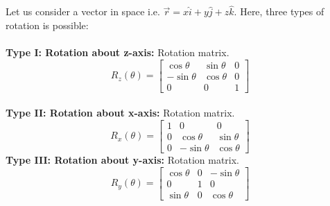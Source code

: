 Let us consider a vector in space i.e. $\vec{r}=x \hat{i}+y \hat{j}+z \hat{k} .$ Here, three types of rotation is possible:
\\\\\textbf{Type I: Rotation about z-axis:}
Rotation matrix. $$R_{z}(\theta)=\left[\begin{array}{ccc}\cos \theta & \sin \theta & 0 \\ -\sin \theta & \cos \theta & 0 \\ 0 & 0 & 1\end{array}\right]$$
\\\textbf{Type  II: Rotation about x-axis:}
Rotation matrix. $$R_{x}(\theta)=\left[\begin{array}{ccc}1 & 0 & 0 \\ 0 & \cos \theta & \sin \theta \\ 0 & -\sin \theta & \cos \theta\end{array}\right]$$
\textbf{Type III: Rotation about y-axis:}
Rotation matrix. $$R_{y}(\theta)=\left[\begin{array}{ccc}\cos \theta & 0 & -\sin \theta \\ 0 & 1 & 0 \\ \sin \theta & 0 & \cos \theta\end{array}\right]$$

